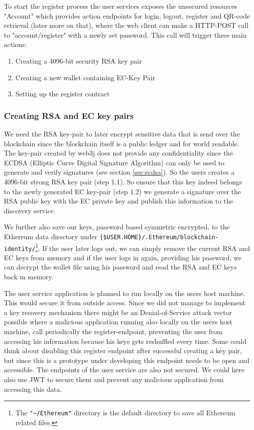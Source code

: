 To start the register process the user services exposes the unsecured resources "Account" which provides action endpoints for login, logout, register and QR-code retrieval (later more on that), where the web client can make a HTTP-POST call to "account/register" with a newly set password.
This call will trigger three main actions:

\begin{enumerate}
\item Creating a 4096-bit security RSA key pair
\item Creating a new wallet containing EC-Key Pair 
\item Setting up the register contract 
\end{enumerate}

\subsubsection{Creating RSA and EC key pairs}
We need the RSA key-pair to later encrypt sensitive data that is send over the blockchain since the blockchain itself is a public ledger and for world readable. The key-pair created by web3j does not provide any confidentiality since the ECDSA (Elliptic Curve Digital Signature Algorithm) can only be used to generate and verify signatures (see section \ref{sec:ecdsa}). So the users creates a 4096-bit strong RSA key pair (step 1.1). So ensure that this key indeed belongs to the newly generated EC key-pair (step 1.2) we generate a signature over the RSA public key with the EC private key and publish this information to the discovery service.

We further also save our keys, password based symmetric encrypted, to the Ethereum data directory under \lstinline|{$USER.HOME}/.Ethereum/blockchain-identity/|\footnote{The \lstinline{"~/Ethereum"} directory is the default directory to save all Ethereum related files.}. If the user later logs out, we can simply remove the current RSA and EC keys from memory and if the user logs in again, providing his password, we can decrypt the wallet file using his password and read the RSA and EC keys back in memory.

The user service application is planned to run locally on the users host machine. This would secure it from outside access. Since we did not manage to implement a key recovery mechanism there might be an Denial-of-Service attack vector possible where a malicious application running also locally on the users host machine, call periodically the register-endpoint, preventing the user from accessing his information because his keys gets reshuffled every time. Some could think about disabling this register endpoint after successful creating a key pair, but since this is a prototype under developing this endpoint needs to be open and accessible. The endpoints of the user service are also not secured. We could here also use JWT to secure them and prevent any malicious application from accessing this data.

